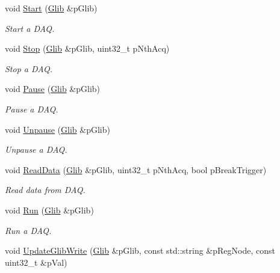 \begin{DoxyCompactItemize}
void \hyperlink{class_ph2___hw_interface_1_1_glib_interface_a0706eb396293fe5c8c717c5d0ab82165}{Start} (\hyperlink{class_ph2___hw_description_1_1_glib}{Glib} \&p\-Glib)
\begin{DoxyCompactList}\small\item\em Start a D\-A\-Q. \end{DoxyCompactList}\item 
void \hyperlink{class_ph2___hw_interface_1_1_glib_interface_a3073d292371ab4e602900f4276a43b6c}{Stop} (\hyperlink{class_ph2___hw_description_1_1_glib}{Glib} \&p\-Glib, uint32\-\_\-t p\-Nth\-Acq)
\begin{DoxyCompactList}\small\item\em Stop a D\-A\-Q. \end{DoxyCompactList}\item 
void \hyperlink{class_ph2___hw_interface_1_1_glib_interface_a1db7815b60c3e3637b23bfa27bab9692}{Pause} (\hyperlink{class_ph2___hw_description_1_1_glib}{Glib} \&p\-Glib)
\begin{DoxyCompactList}\small\item\em Pause a D\-A\-Q. \end{DoxyCompactList}\item 
void \hyperlink{class_ph2___hw_interface_1_1_glib_interface_a4d6568c22d8e3777ee909db37b3b01d6}{Unpause} (\hyperlink{class_ph2___hw_description_1_1_glib}{Glib} \&p\-Glib)
\begin{DoxyCompactList}\small\item\em Unpause a D\-A\-Q. \end{DoxyCompactList}\item 
void \hyperlink{class_ph2___hw_interface_1_1_glib_interface_ad3f91f03b0214987f4a9e8b63ff99dca}{Read\-Data} (\hyperlink{class_ph2___hw_description_1_1_glib}{Glib} \&p\-Glib, uint32\-\_\-t p\-Nth\-Acq, bool p\-Break\-Trigger)
\begin{DoxyCompactList}\small\item\em Read data from D\-A\-Q. \end{DoxyCompactList}\item 
void \hyperlink{class_ph2___hw_interface_1_1_glib_interface_a116aca1863dda40c52ca63259cd073b9}{Run} (\hyperlink{class_ph2___hw_description_1_1_glib}{Glib} \&p\-Glib)
\begin{DoxyCompactList}\small\item\em Run a D\-A\-Q. \end{DoxyCompactList}\item 
void \hyperlink{class_ph2___hw_interface_1_1_glib_interface_afeda624fe12657712e9f10cd60603d8a}{Update\-Glib\-Write} (\hyperlink{class_ph2___hw_description_1_1_glib}{Glib} \&p\-Glib, const std\-::string \&p\-Reg\-Node, const uint32\-\_\-t \&p\-Val)

\end{DoxyCompactItemize}
